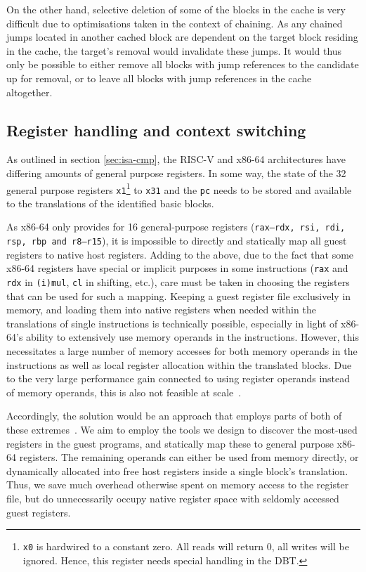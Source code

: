 On the other hand, selective deletion of some of the blocks in the cache is very difficult due to optimisations taken in the context of chaining.
As any chained jumps located in another cached block are dependent on the target block residing in the cache, the target's removal would invalidate these jumps.
It would thus only be possible to either remove all blocks with jump references to the candidate up for removal, or to leave all blocks with jump references in the cache altogether.


\subsection{Register handling and context switching}
\label{sec:context-switch-reg-handle}
As outlined in section \ref{sec:isa-cmp}, the RISC-V and x86-64 architectures have differing amounts of general purpose registers.
In some way, the state of the 32 general purpose registers \texttt{x1}\footnote{\texttt{x0} is hardwired to a constant zero. All reads will return 0, all writes will be ignored. Hence, this register needs special handling in the DBT.} to \texttt{x31} and the \texttt{pc} needs to be stored and available to the translations of the identified basic blocks.

As x86-64 only provides for 16 general-purpose registers (\texttt{rax--rdx, rsi, rdi, rsp, rbp and r8--r15}), it is impossible to directly and statically map all guest registers to native host registers.
Adding to the above, due to the fact that some x86-64 registers have special or implicit purposes in some instructions (\texttt{rax} and \texttt{rdx} in \texttt{(i)mul}, \texttt{cl} in shifting, etc.), care must be taken in choosing the registers that can be used for such a mapping.
Keeping a guest register file exclusively in memory, and loading them into native registers when needed within the translations of single instructions is technically possible, especially in light of x86-64's ability to extensively use memory operands in the instructions.
However, this necessitates a large number of memory accesses for both memory operands in the instructions as well as local register allocation within the translated blocks.
Due to the very large performance gain connected to using register operands instead of memory operands, this is also not feasible at scale~\cite[S. 8f.]{bintrans}.

Accordingly, the solution would be an approach that employs parts of both of these extremes~\cite[S. 9]{bintrans}.
We aim to employ the tools we design to discover the most-used registers in the guest programs, and statically map these to general purpose x86-64 registers.
The remaining operands can either be used from memory directly, or dynamically allocated into free host registers inside a single block's translation.
Thus, we save much overhead otherwise spent on memory access to the register file, but do unnecessarily occupy native register space with seldomly accessed guest registers.

